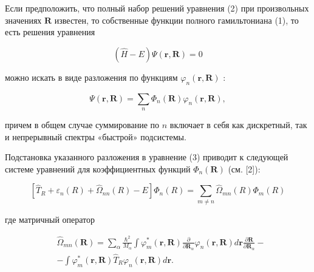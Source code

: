 \documentclass[10pt]{article}
\begin{document}
Если предположить, что полный набор решений уравнения (2) при произвольных значениях $\boldsymbol{R}$ известен, то собственные функции полного гамильтониана (1), то есть решения уравнения



\[

(\hat{H}-E) \Psi(\boldsymbol{r}, \boldsymbol{R})=0

\]



можно искать в виде разложения по функциям $\varphi_{n}(\boldsymbol{r}, \boldsymbol{R})$ :



\[

\Psi(\boldsymbol{r}, \boldsymbol{R})=\sum_{n} \Phi_{n}(\boldsymbol{R}) \varphi_{n}(\boldsymbol{r}, \boldsymbol{R}),

\]



причем в общем случае суммирование по $n$ включает в себя как дискретный, так и непрерывный спектры «быстрой» подсистемы.



Подстановка указанного разложения в уравнение (3) приводит к следующей системе уравнений для коэффициентных функций $\Phi_{n}(\boldsymbol{R})$ (см. [2]):



\[

\left[\hat{T}_{R}+\varepsilon_{n}(R)+\hat{\Omega}_{n n}(R)-E\right] \Phi_{n}(R)=\sum_{m \neq n} \hat{\Omega}_{m n}(R) \Phi_{m}(R)

\]



где матричный оператор



\[

\begin{aligned}

& \hat{\Omega}_{m n}(\boldsymbol{R})=\sum_{\alpha} \frac{\hbar^{2}}{M_{\alpha}} \int \varphi_{m}^{*}(\boldsymbol{r}, \boldsymbol{R}) \frac{\partial}{\partial \boldsymbol{R}_{\alpha}} \varphi_{n}(\boldsymbol{r}, \boldsymbol{R}) d \boldsymbol{r} \frac{\partial \boldsymbol{R}}{\partial \boldsymbol{R}_{\alpha}}- \\

&-\int \varphi_{m}^{*}(\boldsymbol{r}, \boldsymbol{R}) \hat{T}_{R} \varphi_{n}(\boldsymbol{r}, \boldsymbol{R}) d \boldsymbol{r} .

\end{aligned}

\]
\end{document}
